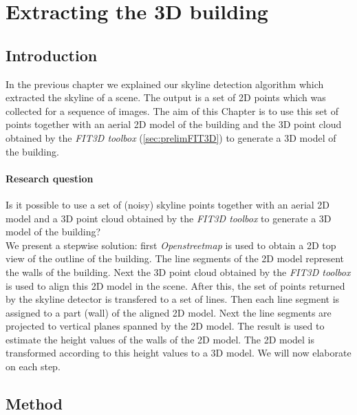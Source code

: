


\section{Extracting the 3D building}
\label{sec:generate3dModel}
\subsection{Introduction}
In the previous chapter we explained our skyline detection algorithm which
extracted the skyline of a scene. The output is a set of 2D points which was  
collected for a sequence of images.
The aim of this Chapter is to use this set of points together with an
 aerial 2D model of the building and the 3D point cloud obtained by the \emph{FIT3D
 toolbox\cite{FIT3D}} (\ref{sec:prelimFIT3D}) to generate a 3D model of the
 building.


\paragraph{Research question}
Is it possible to use a set of (noisy) skyline points together with an aerial
2D model and a 3D point cloud obtained by the \emph{FIT3D toolbox\cite{FIT3D}} to
generate a 3D model of the building?\\

We present a stepwise solution: first \emph{Openstreetmap\cite{Openstreetmap}} is used to obtain a 2D top view of
the outline of the building. The line segments of the 2D model represent the walls of the building. 
Next the 3D point cloud obtained by the \emph{FIT3D toolbox\cite{FIT3D}} is used to align this 2D
model in the scene.  After this, the set of points returned by the skyline
detector is transfered to a set of lines. Then each line segment is assigned to
a part (wall) of the aligned 2D model.  Next the line segments are
projected to vertical planes spanned by the 2D model.  The result is used to
estimate the height values of the walls of the 2D model. The 2D model is
transformed according to this height values to a 3D
model. We will now elaborate on each step.\\


\subsection{Method}
